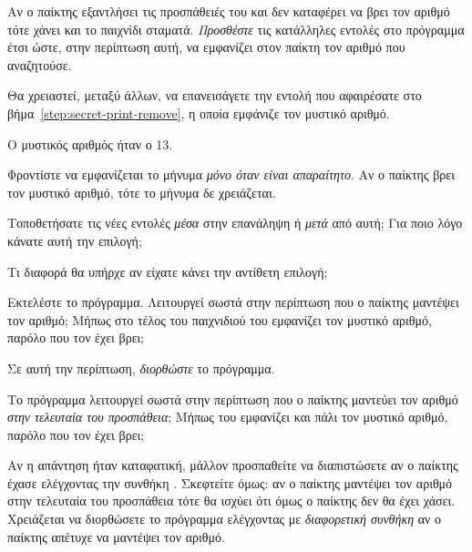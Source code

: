 \documentclass[a4paper,11pt,oneside]{book}
\begin{document}
\begin{step}
Αν ο παίκτης εξαντλήσει τις προσπάθειές του και δεν καταφέρει να βρει τον αριθμό τότε χάνει και το παιχνίδι σταματά. \emph{Προσθέστε} τις κατάλληλες εντολές στο πρόγραμμα έτσι ώστε, στην περίπτωση αυτή, να εμφανίζει στον παίκτη τον αριθμό που αναζητούσε.

\begin{note}
Θα χρειαστεί, μεταξύ άλλων, να επανεισάγετε την εντολή που αφαιρέσατε στο βήμα~\ref{step:secret-print-remove}, η οποία εμφάνιζε τον μυστικό αριθμό.
\end{note} 

\marginnote[14pt]{\iconcomputer}
\begin{pyterm}
Ο μυστικός αριθμός ήταν ο 13.
\end{pyterm}

Φροντίστε να εμφανίζεται το μήνυμα \emph{μόνο όταν είναι απαραίτητο}. Αν ο παίκτης βρει τον μυστικό αριθμό, τότε το μήνυμα δε χρειάζεται.

Τοποθετήσατε τις νέες εντολές \emph{μέσα} στην επανάληψη ή \emph{μετά} από αυτή; Για ποιο λόγο κάνατε αυτή την επιλογή;

\marginnote[14pt]{\icondiscuss}
\dottedline

\dottedline

Τι διαφορά θα υπήρχε αν είχατε κάνει την αντίθετη επιλογή;

\marginnote[14pt]{\icondiscuss}
\dottedline

\dottedline

Εκτελέστε το πρόγραμμα. Λειτουργεί σωστά στην περίπτωση που ο παίκτης μαντέψει τον αριθμό; Μήπως στο τέλος του παιχνιδιού του εμφανίζει τον μυστικό αριθμό, παρόλο που τον έχει βρει;

\marginnote[14pt]{\icondiscuss}
\dottedline

Σε αυτή την περίπτωση, \emph{διορθώστε} το πρόγραμμα.

Tο πρόγραμμα λειτουργεί σωστά στην περίπτωση που ο παίκτης μαντεύει τον αριθμό \emph{στην τελευταία του προσπάθεια}; Μήπως του εμφανίζει και πάλι τον μυστικό αριθμό, παρόλο που τον έχει βρει;

\marginnote[14pt]{\icondiscuss}
\dottedline

\clearpage
Αν η απάντηση ήταν καταφατική, μάλλον προσπαθείτε να διαπιστώσετε αν ο παίκτης έχασε ελέγχοντας την συνθήκη . Σκεφτείτε όμως: αν ο παίκτης μαντέψει τον αριθμό στην τελευταία του προσπάθεια τότε θα ισχύει ότι  όμως ο παίκτης δεν θα έχει χάσει. Χρειάζεται να διορθώσετε το πρόγραμμα ελέγχοντας με \emph{διαφορετική συνθήκη} αν ο παίκτης απέτυχε να μαντέψει τον αριθμό.
\end{step}
\end{document}
